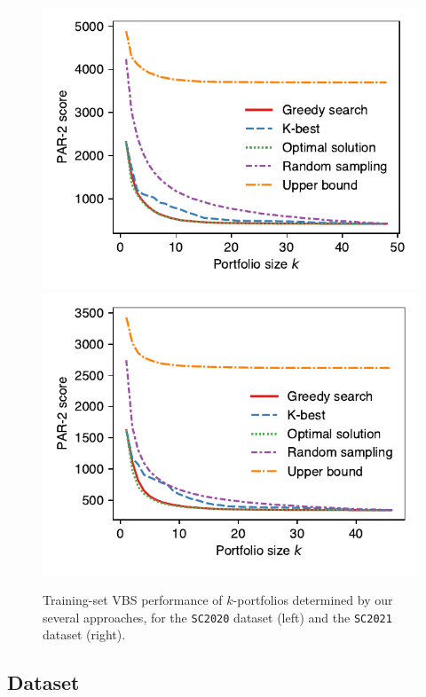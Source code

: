 \documentclass[conference]{IEEEtran}
\begin{document}
\begin{figure}[t]
	\centering
	\includegraphics[width=0.9\columnwidth, trim=0 15 0 10, clip]{plots/search-train-objective-2020.pdf}
	\qquad
	\includegraphics[width=0.9\columnwidth, trim=0 15 0 10, clip]{plots/search-train-objective-2021.pdf}
	\caption{Training-set VBS performance of $k$-portfolios determined by our several approaches, for the \texttt{SC2020} dataset (left) and the \texttt{SC2021} dataset (right).}
	\label{fig:search-train-objective}
\end{figure}

\subsection{Dataset}
\end{document}
